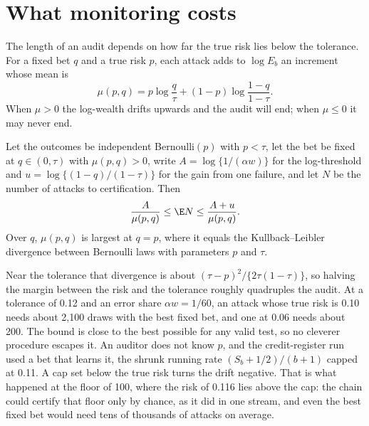\section{What monitoring costs}\label{c06:sec-cost}

The length of an audit depends on how far the true risk lies below the tolerance.
For a fixed bet $q$ and a true risk $p$, each attack adds to $\log E_b$ an
increment whose mean is
\begin{equation}\label{c06:eq-drift}
\mu(p,q) = p \log\frac{q}{\tau} + (1-p)\log\frac{1-q}{1-\tau} .
\end{equation}
When $\mu > 0$ the log-wealth drifts upwards and the audit will end; when $\mu \le
0$ it may never end.

\begin{proposition}\label{c06:prop-length}
Let the outcomes be independent Bernoulli$(p)$ with $p < \tau$, let the bet be fixed
at $q \in (0,\tau)$ with $\mu(p,q) > 0$, write $A = \log\{1/(\alpha w)\}$ for the
log-threshold and $u = \log\{(1-q)/(1-\tau)\}$ for the gain from one failure, and let
$N$ be the number of attacks to certification. Then
\[
\frac{A}{\mu(p,q)} \le \E N \le \frac{A + u}{\mu(p,q)} .
\]
Over $q$, $\mu(p,q)$ is largest at $q = p$, where it equals the Kullback--Leibler
divergence between Bernoulli laws with parameters $p$ and $\tau$.
\end{proposition}

Near the tolerance that divergence is about $(\tau - p)^2/\{2\tau(1-\tau)\}$, so
halving the margin between the risk and the tolerance roughly quadruples the
audit. At a tolerance of 0.12 and an error share $\alpha w = 1/60$, an attack whose
true risk is 0.10 needs about 2,100 draws with the best fixed bet, and one at 0.06
needs about 200.
The bound is close to the best possible for any valid test, so no cleverer
procedure escapes it. An auditor does not know $p$, and the credit-register run
used a bet that learns it, the shrunk running rate $(S_b + 1/2)/(b + 1)$ capped at
0.11. A cap set below the true risk turns the drift negative. That is what happened
at the floor of 100, where the risk of 0.116 lies above the cap: the chain could
certify that floor only by chance, as it did in one stream, and even the best fixed
bet would need tens of thousands of attacks on average.


